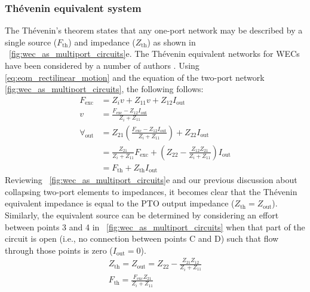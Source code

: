 \documentclass[lettersize,journal]{IEEEtran}
\begin{document}
\subsubsection{Th\'{e}venin equivalent system}\label{sec:thevenin_equivalent_system}
The Th\'{e}venin's theorem \cite{Thevenin:1883aa} states that any one-port network may be described by a single source ($F_{\textrm{th}}$) and impedance ($Z_{\textrm{th}}$) as shown in \figurename~\ref{fig:wec_as_multiport_circuits}e.
The Th\'{e}venin equivalent networks for WECs have been considered by a number of authors \cite{Bacelli:2021aa,Blanco:2019aa,Bubbar:2018aa,Lewis:2013aa}.
Using \eqref{eq:eom_rectilinear_motion} and the equation of the two-port network \eqref{fig:wec_as_multiport_circuits}, the following follows:
\begin{equation}
        \nonumber
        \begin{split}
                F_{\textrm{exc}} &= Z_i v + Z_{11} v + Z_{12}I_{\textrm{out}} \\
                v &= \frac{F_{\textrm{exc}} - Z_{12}I_{\textrm{out}} }{Z_i + Z_{11}} \\
                \forall_{\textrm{out}}  &= Z_{21}\left(\frac{F_{\textrm{exc}} - Z_{12}I_{\textrm{out}} }{Z_i + Z_{11}}\right) + Z_{22}I_{\textrm{out}} \\
                &= \frac{Z_{21}}{Z_i + Z_{11}} F_\textrm{exc} + \left(Z_{22} - \frac{Z_{12}Z_{21}}{Z_i + Z_{11}}\right) I_{\textrm{out}} \\
                &= F_{\textrm{th}} + Z_{\textrm{th}}I_{\textrm{out}}
        \end{split}
\end{equation}
Reviewing \figurename~\ref{fig:wec_as_multiport_circuits}e and our previous discussion about collapsing two-port elements to impedances, it becomes clear that the Th\'{e}venin equivalent impedance is equal to the PTO output impedance ($Z_{\textrm{th}} = Z_{\textrm{out}}$).
Similarly, the equivalent source can be determined by considering an effort between points 3 and 4 in \figurename~\ref{fig:wec_as_multiport_circuits} when that part of the circuit is open (i.e., no connection between points C and D) such that flow through those points is zero ($I_{\textrm{out}}=0$).
\begin{subequations}
\begin{gather}
        Z_{\textrm{th}} = Z_{\textrm{out}} = Z_{22} - \frac{Z_{21} Z_{12}}{Z_{i} + Z_{11}} \label{eq:Thevenin_impedance} \\[0.5em]
        F_{\textrm{th}} = \frac{F_{\textrm{exc}} Z_{21}}{Z_i + Z_{11}} \label{eq:Thevenin_force}
\end{gather}
\end{subequations}
\end{document}
